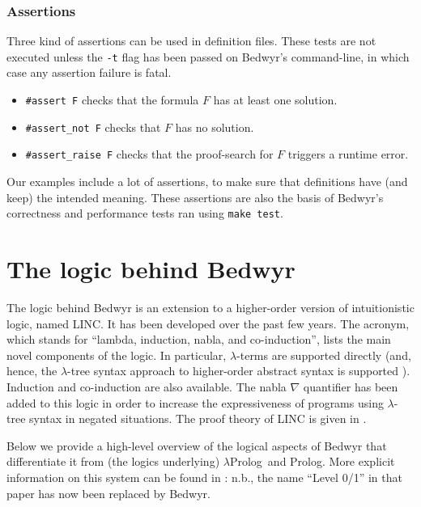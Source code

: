 \documentclass{article}
\newcommand{\lp}{$\lambda$Prolog}
\begin{document}
\subsubsection{Assertions}

Three kind of assertions can be used in definition files.
These tests are not executed unless the \verb.-t. flag has been passed 
on Bedwyr's command-line, in which case any assertion failure is fatal.
\begin{itemize}
\item
\verb.#assert F. checks that the formula $F$ has at least one solution.
\item
\verb.#assert_not F. checks that $F$ has no solution.
\item
\verb.#assert_raise F. checks that the proof-search for $F$ triggers
a runtime error.
\end{itemize}

Our examples include a lot of assertions, to make sure that definitions have 
(and keep) the intended meaning. These assertions are also the basis of
Bedwyr's correctness and performance tests ran using \verb.make test..

\section{The logic behind Bedwyr}
\label{logic}

The logic behind Bedwyr is an extension to a higher-order version of
intuitionistic logic, named LINC.
It has been developed over the past few years.  The acronym, which
stands for ``lambda, induction, nabla, and co-induction'', lists the
main novel components of the logic.  In particular, $\lambda$-terms
are supported directly (and, hence, the $\lambda$-tree syntax approach
to higher-order abstract syntax is supported \cite{miller00cl}).
Induction and co-induction are also available.  The nabla $\nabla$
quantifier has been added to this logic in order to increase the
expressiveness of programs using $\lambda$-tree syntax in negated situations. 
The proof theory of LINC is given in \cite{miller05tocl,tiu04phd}.

Below we provide a high-level overview of the
logical aspects of Bedwyr that differentiate it from (the logics
underlying) \lp\ and Prolog.  More explicit information on this system
can be found in \cite{tiu05eshol}: n.b., the name ``Level 0/1'' in
that paper has now been replaced by Bedwyr.
\end{document}
